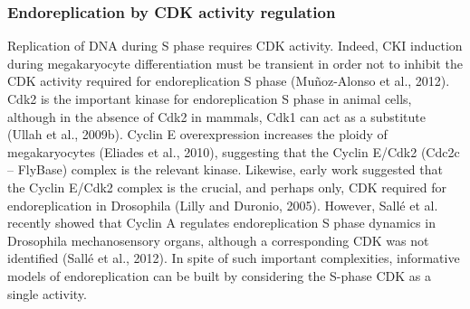 \documentclass[11pt,twoside,a4paper]{report}
\begin{document}
			\subsubsection{Endoreplication by CDK activity regulation}
			Replication of DNA during S phase requires CDK activity. Indeed, CKI induction during megakaryocyte differentiation must be transient in order not to inhibit the CDK activity required for endoreplication S phase (Muñoz-Alonso et al., 2012). Cdk2 is the important kinase for endoreplication S phase in animal cells, although in the absence of Cdk2 in mammals, Cdk1 can act as a substitute (Ullah et al., 2009b). Cyclin E overexpression increases the ploidy of megakaryocytes (Eliades et al., 2010), suggesting that the Cyclin E/Cdk2 (Cdc2c – FlyBase) complex is the relevant kinase. Likewise, early work suggested that the Cyclin E/Cdk2 complex is the crucial, and perhaps only, CDK required for endoreplication in Drosophila (Lilly and Duronio, 2005). However, Sallé et al. recently showed that Cyclin A regulates endoreplication S phase dynamics in Drosophila mechanosensory organs, although a corresponding CDK was not identified (Sallé et al., 2012). In spite of such important complexities, informative models of endoreplication can be built by considering the S-phase CDK as a single activity.
\end{document}
